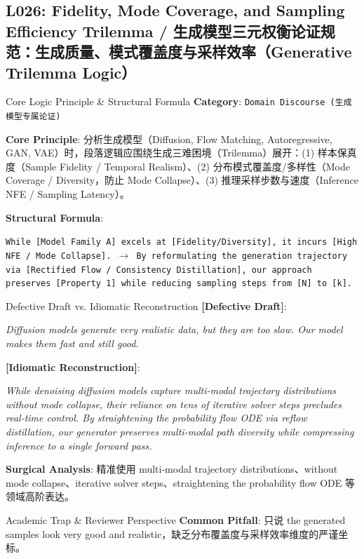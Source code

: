 \subsection{L026: Fidelity, Mode Coverage, and Sampling Efficiency Trilemma / 生成模型三元权衡论证规范：生成质量、模式覆盖度与采样效率（Generative Trilemma Logic）}\label{sec:logic:L026}
\begin{ConceptBox}{Core Logic Principle \& Structural Formula}
\textbf{Category}: \texttt{Domain Discourse (生成模型专属论证)}\par\vspace{3pt}
\textbf{Core Principle}: 分析生成模型（Diffusion, Flow Matching, Autoregressive, GAN, VAE）时，段落逻辑应围绕生成三难困境（Trilemma）展开：(1)  样本保真度（Sample Fidelity / Temporal Realism）、(2)  分布模式覆盖度/多样性（Mode Coverage / Diversity，防止 Mode Collapse）、(3)  推理采样步数与速度（Inference NFE / Sampling Latency）。\par\vspace{4pt}
\textbf{Structural Formula}:\par\noindent\texttt{While [Model Family A] excels at [Fidelity/Diversity], it incurs [High NFE / Mode Collapse]. $\to$ By reformulating the generation trajectory via [Rectified Flow / Consistency Distillation], our approach preserves [Property 1] while reducing sampling steps from [N] to [k].}
\end{ConceptBox}
\begin{ExampleBox}{Defective Draft vs. Idiomatic Reconstruction}
\textbf{\color{TargetHighlight}[Defective Draft]}:\par\textit{Diffusion models generate very realistic data, but they are too slow. Our model makes them fast and still good.}\par\vspace{4pt}
\textbf{\color{AcadNavy}[Idiomatic Reconstruction]}:\par\textit{While denoising diffusion models capture multi-modal trajectory distributions without mode collapse, their reliance on tens of iterative solver steps precludes real-time control. By straightening the probability flow ODE via reflow distillation, our generator preserves multi-modal path diversity while compressing inference to a single forward pass.}\par\vspace{4pt}
\textbf{Surgical Analysis}: 精准使用 multi-modal trajectory distributions、without mode collapse、iterative solver steps、straightening the probability flow ODE 等领域高阶表达。
\end{ExampleBox}
\begin{TipBox}{Academic Trap \& Reviewer Perspective}
\textbf{Common Pitfall}: 只说 the generated samples look very good and realistic，缺乏分布覆盖度与采样效率维度的严谨坐标。
\end{TipBox}
\vspace{6pt}

